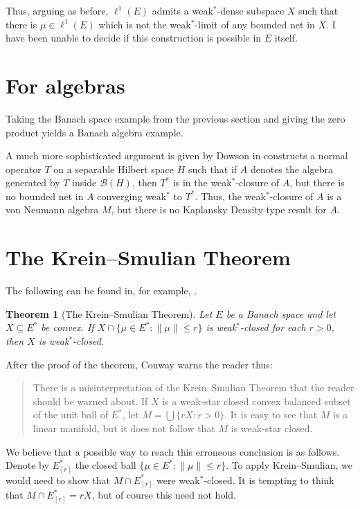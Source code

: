 \documentclass[a4paper,12pt]{article}
\theoremstyle{plain}
\newtheorem{theorem}[proposition]{Theorem}
\theoremstyle{definition}
\newcommand{\mc}{\mathcal}
\begin{document}
Thus, arguing as before, $\ell^1(E)$ admits a weak$^*$-dense subspace $X$ such that there is
$\mu\in \ell^1(E)$ which is not the weak$^*$-limit of any bounded net in $X$.  I have
been unable to decide if this construction is possible in $E$ itself.



\section{For algebras}

Taking the Banach space example from the previous section and giving the zero product yields a
Banach algebra example.

A much more sophisticated argument is given by Dowson in \cite{dowson} constructs a normal operator
$T$ on a separable Hilbert space $H$ such that if $A$ denotes the algebra generated by $T$ inside
$\mc B(H)$, then $T^*$ is in the weak$^*$-closure of $A$, but there is no bounded net in $A$
converging weak$^*$ to $T^*$.  Thus, the weak$^*$-closure of $A$ is a von Neumann algebra $M$,
but there is no Kaplansky Density type result for $A$.





\section{The Krein--Smulian Theorem}

The following can be found in, for example, \cite[Chapter~5, Section~12]{conway}.

\begin{theorem}[The Krein--Smulian Theorem]
Let $E$ be a Banach space and let $X\subseteq E^*$ be convex.  If $X\cap\{\mu\in E^*:\|\mu\|\leq r\}$
is weak$^*$-closed for each $r> 0$, then $X$ is weak$^*$-closed.
\end{theorem}

After the proof of the theorem, Conway warns the reader thus:

\begin{quote}
There is a misinterpretation of the Krein--Smulian Theorem that the reader should be warned about.
If $X$ is a weak-star closed convex balanced subset of the unit ball of $E^*$, let $M = \bigcup
\{ rX:r>0\}$.  It is easy to see that $M$ is a linear manifold, but it does not follow that $M$
is weak-star closed.
\end{quote}

We believe that a possible way to reach this erroneous conclusion is as follows.  Denote by
$E^*_{[r]}$ the closed ball $\{\mu\in E^* : \|\mu\|\leq r\}$.  To apply Krein--Smulian, we would
need to show that $M \cap E^*_{[r]}$ were weak$^*$-closed.  It is tempting to think that
$M \cap E^*_{[r]} = rX$, but of course this need not hold.
\end{document}
